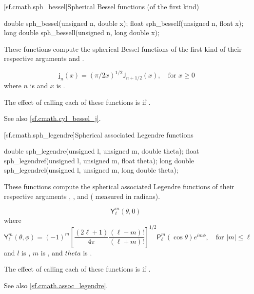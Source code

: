 [sf.cmath.sph_bessel]{Spherical Bessel functions (of the first kind)}%
%
%
%
%
%
\begin{itemdecl}
double       sph_bessel(unsigned n, double x);
float        sph_besself(unsigned n, float x);
long double  sph_bessell(unsigned n, long double x);
\end{itemdecl}

\begin{itemdescr}

\pnum\effects
These functions compute
the spherical Bessel functions of the first kind
of their respective arguments
 and .

\pnum\returns
\[%
  \mathsf{j}_n(x) =
  (\pi/2x)^{1\!/\!2} \mathsf{J}_{n + 1\!/\!2}(x),
	   \quad \mbox{for $x \ge 0$}
\]
where
$n$ is  and
$x$ is .

\pnum\remark
The effect of calling each of these functions
is 
if .

\pnum See also \ref{sf.cmath.cyl_bessel_j}.
\end{itemdescr}

[sf.cmath.sph_legendre]{Spherical associated Legendre functions}%
%
%
%
%
%
%
\begin{itemdecl}
double       sph_legendre(unsigned l, unsigned m, double theta);
float        sph_legendref(unsigned l, unsigned m, float theta);
long double  sph_legendrel(unsigned l, unsigned m, long double theta);
\end{itemdecl}

\begin{itemdescr}
\pnum\effects
These functions compute the spherical associated Legendre functions
of their respective arguments
, , and  ( measured in radians).

\pnum\returns
\[%
  \mathsf{Y}_\ell^m(\theta, 0)
\;\]
where
\[%
  \mathsf{Y}_\ell^m(\theta, \phi) =
  (-1)^m \left[ \frac{(2 \ell + 1)}
                     {4 \pi}
	        \frac{(\ell - m)!}
	             {(\ell + m)!}
         \right]^{1/2}
	 \mathsf{P}_\ell^m
	 ( \cos\theta ) e ^ {i m \phi},
	   \quad \mbox{for $|m| \le \ell$}
\]
and
$l$ is ,
$m$ is , and
$theta$ is .

\pnum\remark
The effect of calling each of these functions
is 
if .

\pnum See also \ref{sf.cmath.assoc_legendre}.
\end{itemdescr}

